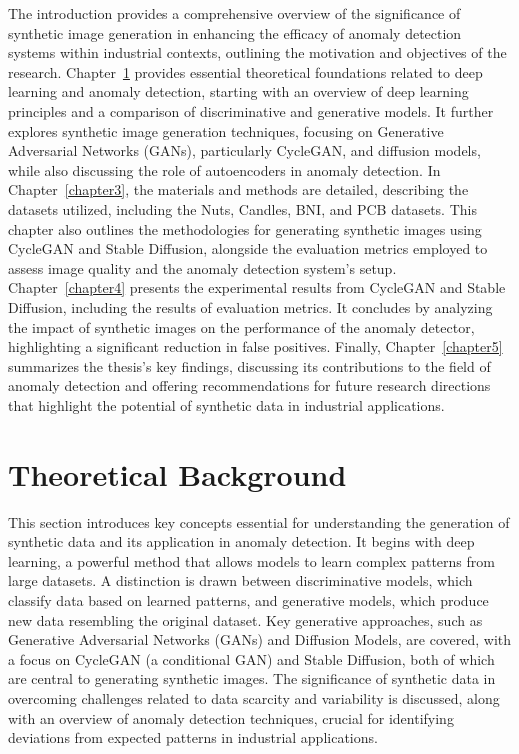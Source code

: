 \documentclass[12pt,DIV14,BCOR12mm,a4paper,footinclude=false,headinclude,parskip=half-,twoside,openright,cleardoublepage=empty,toc=index,bibliography=totoc,listof=totoc]{scrreprt}
\numberwithin{equation}{chapter}
\begin{document}
The introduction provides a comprehensive overview of the significance of synthetic image generation in enhancing the efficacy of anomaly detection systems within industrial contexts, outlining the motivation and objectives of the research. Chapter~\ref{chapter2} provides essential theoretical foundations related to deep learning and anomaly detection, starting with an overview of deep learning principles and a comparison of discriminative and generative models. It further explores synthetic image generation techniques, focusing on Generative Adversarial Networks (GANs), particularly CycleGAN, and diffusion models, while also discussing the role of autoencoders in anomaly detection. In Chapter~\ref{chapter3}, the materials and methods are detailed, describing the datasets utilized, including the Nuts, Candles, BNI, and PCB datasets. This chapter also outlines the methodologies for generating synthetic images using CycleGAN and Stable Diffusion, alongside the evaluation metrics employed to assess image quality and the anomaly detection system's setup. Chapter~\ref{chapter4} presents the experimental results from CycleGAN and Stable Diffusion, including the results of evaluation metrics. It concludes by analyzing the impact of synthetic images on the performance of the anomaly detector, highlighting a significant reduction in false positives. Finally, Chapter~\ref{chapter5} summarizes the thesis's key findings, discussing its contributions to the field of anomaly detection and offering recommendations for future research directions that highlight the potential of synthetic data in industrial applications.

\chapter{Theoretical Background}
\label{chapter2}
This section introduces key concepts essential for understanding the generation of synthetic data and its application in anomaly detection. It begins with deep learning, a powerful method that allows models to learn complex patterns from large datasets. A distinction is drawn between discriminative models, which classify data based on learned patterns, and generative models, which produce new data resembling the original dataset. Key generative approaches, such as Generative Adversarial Networks (GANs) and Diffusion Models, are covered, with a focus on CycleGAN (a conditional GAN) and Stable Diffusion, both of which are central to generating synthetic images. The significance of synthetic data in overcoming challenges related to data scarcity and variability is discussed, along with an overview of anomaly detection techniques, crucial for identifying deviations from expected patterns in industrial applications.
\end{document}
